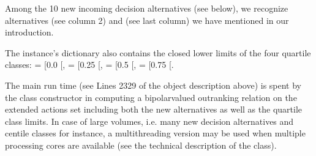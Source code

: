 \documentclass[a4paper,12pt,english]{sphinxhowto}
\begin{document}
Among the 10 new incoming decision alternatives (see below), we recognize alternatives  (see column 2) and  (see last column) we have mentioned in our introduction.

The  instance’s  dictionary also contains the closed lower limits of the four quartile classes:  = {[}0.0\sphinxhyphen{} {[},  = {[}0.25\sphinxhyphen{} {[},  = {[}0.5\sphinxhyphen{} {[},  = {[}0.75 \sphinxhyphen{} {[}.

\begin{sphinxVerbatim}[commandchars=\\\{\},numbers=left,firstnumber=1,stepnumber=1]
\end{sphinxVerbatim}

The main run time (see Lines 23\sphinxhyphen{}29 of the object description above) is spent by the class constructor in computing a bipolar\sphinxhyphen{}valued outranking relation on the extended actions set including both the new alternatives as well as the quartile class limits. In case of large volumes, i.e. many new decision alternatives and centile classes for instance, a multi\sphinxhyphen{}threading version may be used when multiple processing cores are available (see the technical description of the  class).
\end{document}
